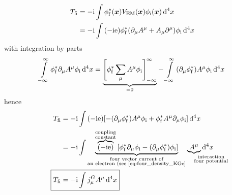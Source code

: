 \begin{center}
\end{center}
\begin{align}\begin{split}
    T_{\mathrm{fi}} & = - \mathrm{i} \int \phi_{\mathrm{f}}^* \qty({\bm{x}}) V_{\mathrm{EM}} \qty({\bm{x}}) \phi_{\mathrm{i}}\qty({\bm{x}}) \dd[4]{x} \\
    & = - \mathrm{i} \int \qty(-\mathrm{i} \mathrm{e}) \phi_{\mathrm{f}}^* \qty(\partial_\mu A^\mu + A_\mu \partial^\mu) \phi_{\mathrm{i}} \dd[4]{x}
\end{split}\end{align}
with integration by parts
\begin{align}
    \int\limits_{-\infty}^{\infty} \phi_{\mathrm{f}}^* \partial_\mu A^\mu \phi_{\mathrm{i}} \dd[4]{x} = \underbrace{\qty[\phi_{\mathrm{f}}^* \sum_\mu A^\mu \phi_{\mathrm{i}}]_{-\infty}^{\infty}}_{=0} - \int\limits_{-\infty}^{\infty} \qty(\partial_\mu \phi_{\mathrm{f}}^*) A^\mu \phi_{\mathrm{i}} \dd[4]{x}
\end{align}
hence
\begin{align}\begin{split}\label{eq:transition_amplitude_tree}
    T_\mr{fi} & = -\ti \int \qty(-\ti \mr e) \qty[ - \qty(\pa_\mu \phi_\mr{f}^*) A^\mu \phi_\mr{i} + \phi_\mr{f}^* A^\mu \pa_\mu \phi_\mr{i} ] \dd[4]{x} \\
    & = - \ti \int \underbrace{\overbrace{\qty(-\ti\mr e)}^{\substack{\text{coupling}\\\text{constant}}} \qty[ \phi_\mr{f}^* \pa_\mu \phi_\mr{i} - \qty(\pa_\mu \phi_\mr{f}^*) \phi_\mr{i} ]}_{\substack{\text{four vector current of} \\ \text{an electron (see \cref{eq:four_density_KGe}}}} \underbrace{\ A^\mu\ }_{\mathrlap{\substack{\text{interaction} \\ \text{four potential}}}} \dd[4]{x}\\
    \Aboxed{ T_\mr{fi} & = -\ti \int j_\mu^G A^\mu \dd[4]{x}}
\end{split}\end{align}
